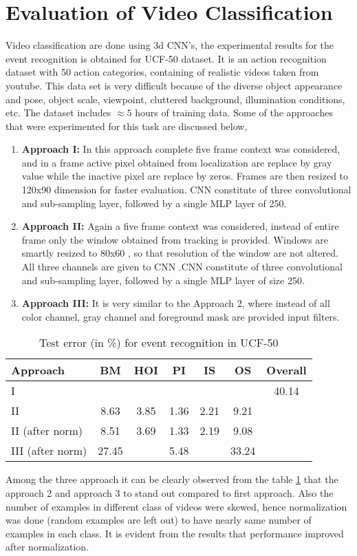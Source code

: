 \section{Evaluation of Video Classification} 
Video classification are done using 3d CNN's, the experimental results for the event recognition is obtained for UCF-50 dataset. It is an action recognition dataset with 50 action categories, containing of realistic videos taken from youtube. This data set is very difficult because of the diverse object appearance and pose, object scale, viewpoint, cluttered background, illumination conditions, etc. The dataset includes $\approx{5}$ hours of training data. Some of the approaches that were experimented for this task are discussed below,
\begin{enumerate}
	\item{\textbf{Approach I:} In this approach complete five frame context was considered, and in a frame active pixel obtained from localization are replace by gray value while the inactive pixel are replace by zeros. Frames are then resized to 120x90 dimension for faster evaluation. CNN constitute of three convolutional and sub-sampling layer,  followed by a single MLP layer of 250.}
	\item{\textbf{Approach II:} Again a five frame context was considered, instead of entire frame only the window obtained from tracking is provided.  Windows are smartly resized to 80x60 , so that resolution of the window are not altered. All three channels are given to CNN .CNN constitute of three convolutional and sub-sampling layer,  followed by a single MLP layer of size 250.}
	\item{\textbf{Approach III:} It is very similar to the Approach 2, where instead of all color channel, gray channel and foreground mask are provided input filters.}	
\end{enumerate}
\begin{table}[htbp]
   \caption{Test error (in \%) for event recognition in UCF-50}
   \begin{center}
   \begin{tabular}{|l|c|c|c|c|c|c|} \hline
        \textbf{Approach} & \textbf{BM} & \textbf{HOI} & \textbf{PI} & \textbf{IS} & \textbf{OS} & Overall \\ \hline
        I & & & & & & 40.14\\ \hline
		II & 8.63 & 3.85 & 1.36 & 2.21 & 9.21 & \\ \hline
		II (after norm) & 8.51 & 3.69 & 1.33 & 2.19 & 9.08 & \\ \hline		 
		III (after norm) & 27.45 &  & 5.48 & & 33.24 & \\ \hline
   \end{tabular}
   \label{tab:recognition}
   \medskip \small 
   \end{center}
 \end{table} 
Among the three approach it can be clearly observed from the table \ref{tab:recognition} that the approach 2 and approach 3 to stand out compared to first approach. Also the number of examples in different class of videos were skewed, hence normalization was done (random examples are left out) to have nearly same number of examples in each class. It is evident from the results that performance improved after normalization.

